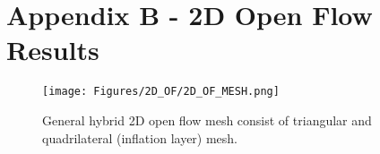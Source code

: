 \newpage
\flushleft
\section*{Appendix B - 2D Open Flow Results} 
\centering

\begin{figure}[!h]
    \centering
    \texttt{[image: Figures/2D\_OF/2D\_OF\_MESH.png]}
    \caption{General hybrid 2D open flow mesh consist of triangular and quadrilateral (inflation layer) mesh.}
    \label{fig:2D_OF_MESH}
\end{figure}